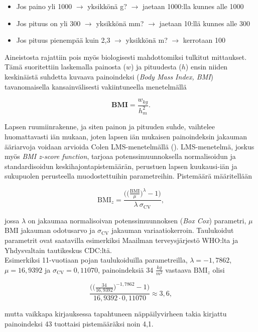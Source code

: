 \documentclass[finnish]{docopts}
\begin{document}
\begin{itemize}
    \item Jos paino yli 1000 $\longrightarrow$ yksikkönä g?  $\longrightarrow$ jaetaan 1000:lla kunnes alle 1000
    \item Jos pituus on yli 300 $\longrightarrow$ yksikkönä mm? $\longrightarrow$ jaetaan 10:llä kunnes alle 300
    \item Jos pituus pienempää kuin 2,3 $\longrightarrow$ yksikkönä m? $\longrightarrow$ kerrotaan 100
\end{itemize}

Aineistosta rajattiin pois myös biologisesti mahdottomiksi tulkitut mittaukset. Tämä suoritettiin laskemalla painosta ($w$) ja pituudesta ($h$) ensin niiden keskinäistä suhdetta kuvaava painoindeksi (\textit{Body Mass Index, BMI}) tavanomaisella kansainvälisesti vakiintuneella menetelmällä

$$
\textbf{BMI} = \frac{w_{kg}}{h_{m}^2}.
$$

Lapsen ruumiinrakenne, ja siten painon ja pituuden suhde, vaihtelee huomattavasti iän mukaan, joten lapsen iän mukaisen painoindeksin jakauman ääriarvoja voidaan arvioida Colen LMS-menetelmällä (\cite{cole90}). LMS-menetelmä, joskus myös \textit{BMI z-score function}, tarjoaa potenssimuunnoksella normalisoidun ja standardisoidun keskihajontapistemäärän, perustuen lapsen kuukausi-iän ja sukupuolen perusteella muodostettuihin parametreihin. Pistemäärä määritellään

$$
\text{BMI}_z = \frac{\bigg( \big( \frac{\text{BMI}}{\mu}\big)^\lambda - 1 \bigg)}{\lambda \ \sigma_{\text{CV}}},
$$

jossa $\lambda$ on jakaumaa normalisoivan potenssimuunnoksen (\textit{Box Cox}) parametri, $\mu$ BMI jakauman odotusarvo ja $\sigma_{\text{CV}}$ jakauman variaatiokerroin. Taulukoidut parametrit ovat saatavilla esimerkiksi Maailman terveysjärjestö WHO:lta ja Yhdysvaltain tautikeskus CDC:ltä.\\

Esimerkiksi 11-vuotiaan pojan taulukoiduilla parametreilla, $\lambda = -1,7862$, $\mu = 16,9392$ ja $\sigma_{\text{CV}} = 0,11070$, painoindeksiä 34 $\frac{kg}{m^2}$ vastaava $\text{BMI}_z$ olisi

$$
\frac{\bigg( \big( \frac{34}{16,9392}\big)^{-1,7862} - 1 \bigg)}{16,9392 \cdot 0,11070} \approx 3,6,
$$

mutta vaikkapa kirjauksessa tapahtuneen näppäilyvirheen takia kirjattu painoindeksi 43 tuottaisi pistemääräksi noin 4,1.\\
\end{document}
